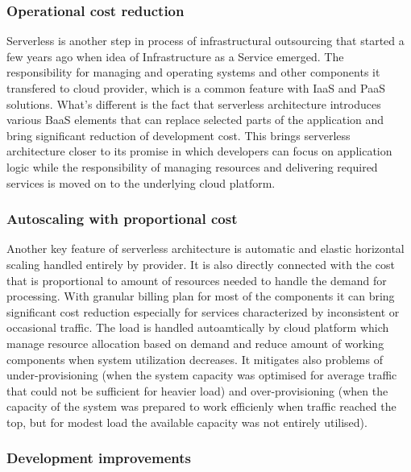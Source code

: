 \subsubsection*{Operational cost reduction}

Serverless is another step in process of infrastructural outsourcing that started a few years ago when idea of Infrastructure as a Service emerged. 
The responsibility for managing and operating systems and other components it transfered to cloud provider, which is a common feature with IaaS and PaaS solutions.
What's different is the fact that serverless architecture introduces various BaaS elements that can replace selected parts of the application and bring significant reduction of development cost.
This brings serverless architecture closer to its promise in which developers can focus on application logic while the responsibility of managing resources and delivering required services is moved on to the underlying cloud platform.

\subsubsection*{Autoscaling with proportional cost}

Another key feature of serverless architecture is automatic and elastic horizontal scaling handled entirely by provider. 
It is also directly connected with the cost that is proportional to amount of resources needed to handle the demand for processing. 
With granular billing plan for most of the components it can bring significant cost reduction especially for services characterized by inconsistent or occasional traffic.
The load is handled autoamtically by cloud platform which manage resource allocation based on demand and reduce amount of working components when system utilization decreases. 
It mitigates also problems of under-provisioning (when the system capacity was optimised for average traffic that could not be sufficient for heavier load) and over-provisioning (when the capacity of the system was prepared to work efficienly when traffic reached the top, but for modest load the available capacity was not entirely utilised).


\subsubsection*{Development improvements}

